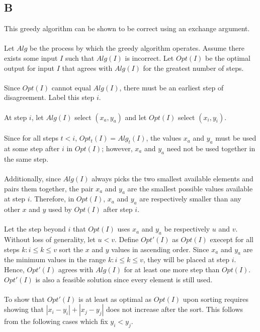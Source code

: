 \documentclass[12pt]{article}
\begin{document}
\subsection*{B}
This greedy algorithm can be shown to be correct using an
exchange argument.\\\\
Let $Alg$ be the process by which the greedy algorithm operates.
Assume there exists some input $I$ such that $Alg(I)$ is incorrect.
Let $Opt(I)$ be the optimal output for input $I$ that agrees with
$Alg(I)$ for the greatest number of steps.\\\\
Since $Opt(I)$ cannot equal $Alg(I)$, there must be an earliest
step of disagreement.  Label this step $i$.\\\\
At step $i$, let $Alg(I)$ select $(x_a, y_a)$ and let $Opt(I)$ select
$(x_i,y_i)$.\\\\
Since for all steps $t < i$, $Opt_t(I) = Alg_t(I)$, the values $x_a$ and
$y_a$ must be used at some step after $i$ in $Opt(I)$; however, $x_a$ and
$y_a$ need not be used together in the same step.\\\\
Additionally, since $Alg(I)$ always picks the two smallest available
elements and pairs them together, the pair $x_a$ and $y_a$ are the smallest
possible values available at step $i$.  Therefore, in $Opt(I)$, $x_a$ and
$y_a$ are respectively smaller than any other $x$ and $y$ used by $Opt(I)$
after step $i$.\\\\
Let the step beyond $i$ that $Opt(I)$ uses
$x_a$ and $y_a$ be respectively $u$ and $v$.  Without loss of generality,
let $u < v$.  Define $Opt'(I)$ as $Opt(I)$ execept for all steps $k: i \leq 
k \leq v$ sort the $x$ and $y$ values in ascending order.  Since $x_a$ and $y_a$
are the minimum values in the range $k: i \leq k \leq v$, they will be placed
at step $i$.  Hence, $Opt'(I)$ agrees with $Alg(I)$ for at least one more
step than $Opt(I)$.  $Opt'(I)$ is also a feasible solution since every element
is still used.\\\\
To show that $Opt'(I)$ is at least as optimal as $Opt(I)$ upon sorting requires
showing that $|x_i - y_i| + |x_j - y_j|$ does not increase after the sort.  This
follows from the following cases which fix $y_i < y_j$.\\\\  
\end{document}

